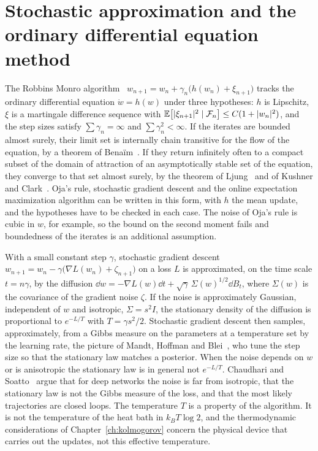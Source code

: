 \section{Stochastic approximation and the ordinary differential equation method}
\label{sec:stoch_approx}

The Robbins Monro algorithm~\cite{robbinsmonro1951} $w_{n+1} = w_n+\gamma_n\big(h(w_n)+\xi_{n+1}\big)$ tracks the ordinary differential equation $\dot w = h(w)$ under three hypotheses: $h$ is Lipschitz, $\xi$ is a martingale difference sequence with $\mathbb{E}\big[|\xi_{n+1}|^2\mid\mathcal{F}_n\big]\leq C(1+|w_n|^2)$, and the step sizes satisfy $\sum\gamma_n = \infty$ and $\sum\gamma_n^2<\infty$. If the iterates are bounded almost surely, their limit set is internally chain transitive for the flow of the equation, by a theorem of Bena\"im~\cite{benaim1999}. If they return infinitely often to a compact subset of the domain of attraction of an asymptotically stable set of the equation, they converge to that set almost surely, by the theorem of Ljung~\cite{ljung1977} and of Kushner and Clark~\cite{kushnerclark1978}. Oja's rule, stochastic gradient descent and the online expectation maximization algorithm can be written in this form, with $h$ the mean update, and the hypotheses have to be checked in each case. The noise of Oja's rule is cubic in $w$, for example, so the bound on the second moment fails and boundedness of the iterates is an additional assumption.

With a small constant step $\gamma$, stochastic gradient descent $w_{n+1} = w_n-\gamma\big(\nabla L(w_n)+\zeta_{n+1}\big)$ on a loss $L$ is approximated, on the time scale $t = n\gamma$, by the diffusion $\dd w = -\nabla L(w)\dd t+\sqrt\gamma\,\Sigma(w)^{1/2}\dd B_t$, where $\Sigma(w)$ is the covariance of the gradient noise $\zeta$. If the noise is approximately Gaussian, independent of $w$ and isotropic, $\Sigma = s^2I$, the stationary density of the diffusion is proportional to $e^{-L/T}$ with $T = \gamma s^2/2$. Stochastic gradient descent then samples, approximately, from a Gibbs measure on the parameters at a temperature set by the learning rate, the picture of Mandt, Hoffman and Blei~\cite{mandt2017}, who tune the step size so that the stationary law matches a posterior. When the noise depends on $w$ or is anisotropic the stationary law is in general not $e^{-L/T}$. Chaudhari and Soatto~\cite{chaudhari2018} argue that for deep networks the noise is far from isotropic, that the stationary law is not the Gibbs measure of the loss, and that the most likely trajectories are closed loops. The temperature $T$ is a property of the algorithm. It is not the temperature of the heat bath in $k_BT\log2$, and the thermodynamic considerations of Chapter~\ref{ch:kolmogorov} concern the physical device that carries out the updates, not this effective temperature.

